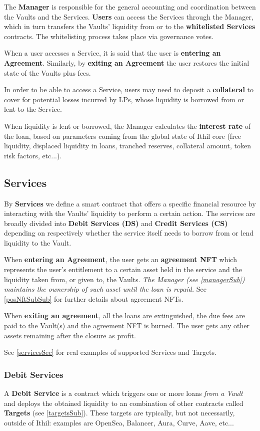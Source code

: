 \documentclass[a4paper,10 pt]{article}
\theoremstyle{definition}
\begin{document}
The {\bf Manager} is responsible for the general accounting and coordination between the Vaults and the Services. {\bf Users} can access the Services through the Manager, which in turn transfers the Vaults' liquidity from or to the {\bf whitelisted Services} contracts. The whitelisting process takes place via governance votes.

When a user accesses a Service, it is said that the user is {\bf entering an Agreement}. Similarly, by {\bf exiting an Agreement} the user restores the initial state of the Vaults plus fees.

In order to be able to access a Service, users may need to deposit a {\bf collateral} to cover for potential losses incurred by LPs, whose liquidity is borrowed from or lent to the Service.

When liquidity is lent or borrowed, the Manager calculates the {\bf interest rate} of the loan, based on parameters coming from the global state of Ithil core (free liquidity, displaced liquidity in loans, tranched reserves,  collateral amount, token risk factors, etc...).

\subsection{Services}\label{servicesSub}

By {\bf Services} we define a smart contract that offers a specific financial resource by interacting with the Vaults' liquidity to perform a certain action. The services are broadly divided into {\bf Debit Services (DS)} and {\bf Credit Services (CS)} depending on respectively whether the service itself needs to borrow from or lend liquidity to the Vault.

When {\bf entering an Agreement}, the user gets an {\bf agreement NFT} which represents the user's entitlement to a certain asset held in the service and the liquidity taken from, or given to, the Vaults. {\it The Manager (see \ref{managerSub}) maintains the ownership of such asset until the loan is repaid.} See \ref{posNftSubSub} for further details about agreement NFTs.

When {\bf exiting an agreement}, all the loans are extinguished, the due fees are paid to the Vault(s) and the agreement NFT is burned. The user gets any other assets remaining after the closure as profit.

See \ref{servicesSec} for real examples of supported Services and Targets.

\subsubsection{Debit Services}\label{debitSubSub}
A {\bf Debit Service} is a contract which triggers one or more loans {\it from a Vault} and deploys the obtained liquidity to an combination of other contracts called {\bf Targets} (see \ref{targetsSub}). These targets are typically, but not necessarily, outside of Ithil: examples are OpenSea, Balancer, Aura, Curve, Aave, etc...
\end{document}
